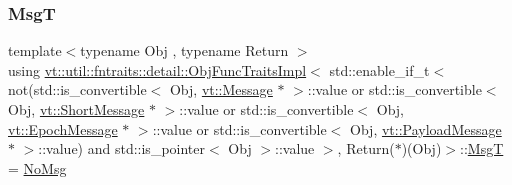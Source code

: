 \subsubsection{\texorpdfstring{MsgT}{MsgT}}
{\footnotesize\ttfamily template$<$typename Obj , typename Return $>$ \\
using \hyperlink{structvt_1_1util_1_1fntraits_1_1detail_1_1_obj_func_traits_impl}{vt\+::util\+::fntraits\+::detail\+::\+Obj\+Func\+Traits\+Impl}$<$ std\+::enable\+\_\+if\+\_\+t$<$ not(std\+::is\+\_\+convertible$<$ Obj, \hyperlink{namespacevt_a3a3ddfef40b4c90915fa43cdd5f129ea}{vt\+::\+Message} $\ast$ $>$\+::value or std\+::is\+\_\+convertible$<$ Obj, \hyperlink{namespacevt_a1125ac1da6c0bbf141e0ea0739d7602d}{vt\+::\+Short\+Message} $\ast$ $>$\+::value or std\+::is\+\_\+convertible$<$ Obj, \hyperlink{namespacevt_ad67368ffae52d7325002586b41bb150e}{vt\+::\+Epoch\+Message} $\ast$ $>$\+::value or std\+::is\+\_\+convertible$<$ Obj, \hyperlink{namespacevt_a89a92229c5622b855c02c549f83a1a68}{vt\+::\+Payload\+Message} $\ast$ $>$\+::value) and std\+::is\+\_\+pointer$<$ Obj $>$\+::value $>$, Return($\ast$)(Obj)$>$\+::\hyperlink{structvt_1_1util_1_1fntraits_1_1detail_1_1_obj_func_traits_impl_3_01std_1_1enable__if__t_3_01not8a3cf894b8afc41bf28f29f3b0ac693f_a16da9a9116724b05701dfd9b4d0075f3}{MsgT} =  \hyperlink{structvt_1_1util_1_1fntraits_1_1detail_1_1_no_msg}{No\+Msg}}


